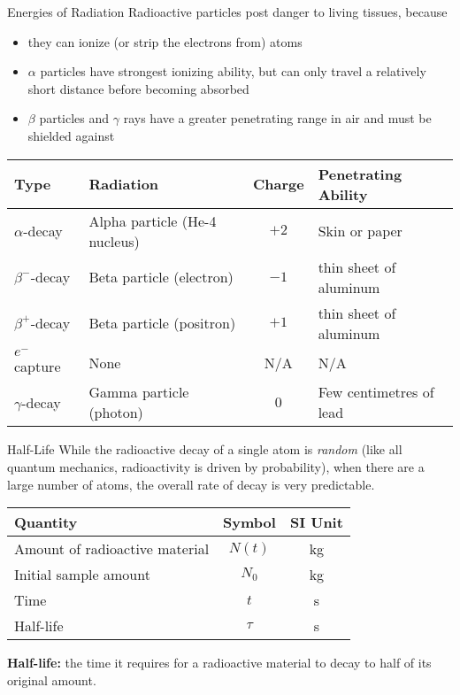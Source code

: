 \documentclass[12pt,compress,aspectratio=169]{beamer}
\newcommand{\eq}[2]{
  \vspace{#1}{\Large\begin{displaymath}#2\end{displaymath}}
}
\begin{document}
\begin{frame}{Energies of Radiation}
  Radioactive particles post danger to living tissues, because
  \begin{itemize}
  \item they can ionize (or strip the electrons from) atoms
  \item $\alpha$ particles have strongest ionizing ability, but can only travel
    a relatively short distance before becoming absorbed
  \item $\beta$ particles and $\gamma$ rays have a greater penetrating range in
    air and must be shielded against
  \end{itemize}
  \begin{tabular}{l|l|c|l}
    \rowcolor{pink}
    \textbf{Type} & \textbf{Radiation} & \textbf{Charge} &
    \textbf{Penetrating Ability}\\ \hline
    $\alpha$-decay   & Alpha particle (He-4 nucleus) & $+2$ & Skin or paper\\
    $\beta^-$-decay  & Beta particle (electron)          & $-1$ &
    thin sheet of aluminum\\
    $\beta^+$-decay  & Beta particle (positron)          & $+1$ &
    thin sheet of aluminum\\
    $e^-$ capture & None                              & N/A  & N/A \\
    $\gamma$-decay   & Gamma particle (photon)           & $0$  &
    Few centimetres of lead
  \end{tabular}
\end{frame}



\begin{frame}{Half-Life}
  While the radioactive decay of a single atom is \emph{random} (like all
  quantum mechanics, radioactivity is driven by probability), when there are a
  large number of atoms, the overall rate of decay is very predictable.
  
  \eq{-.2in}{
    \boxed{N(t)=N_0\left(\frac12\right)^{\frac{t}\tau}}
  }
  \begin{center}
    \begin{tabular}{l|c|c}
      \rowcolor{pink}
      \textbf{Quantity}      & \textbf{Symbol} & \textbf{SI Unit} \\ \hline
      Amount of radioactive material & $N(t)$  & \si{\kilogram}\\
      Initial sample amount          & $N_0$   & \si{\kilo\gram}\\
      Time                           & $t$     & \si{\second} \\
      Half-life                      & $\tau$  & \si{\second}
    \end{tabular}
  \end{center}
  \textbf{Half-life:} the time it requires for a radioactive material to decay
  to half of its original amount.
\end{frame}
\end{document}
